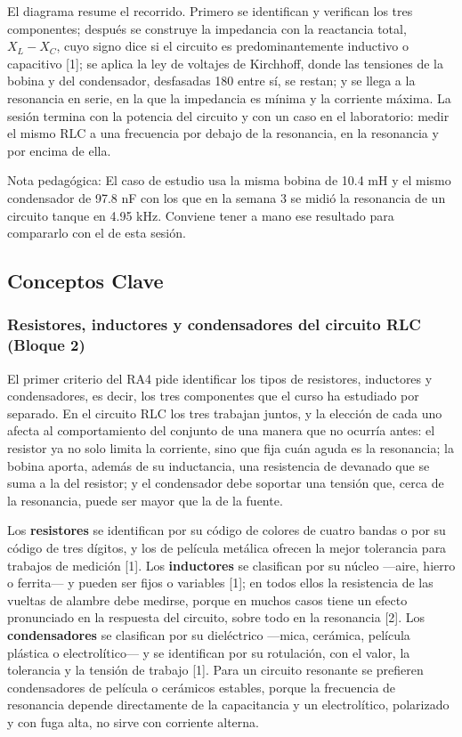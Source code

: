 \documentclass[11pt,letterpaper]{article}
\begin{document}
El diagrama resume el recorrido. Primero se identifican y verifican los tres componentes; después se construye la impedancia con la reactancia total, $X_L - X_C$, cuyo signo dice si el circuito es predominantemente inductivo o capacitivo [1]; se aplica la ley de voltajes de Kirchhoff, donde las tensiones de la bobina y del condensador, desfasadas 180\textdegree{} entre sí, se restan; y se llega a la resonancia en serie, en la que la impedancia es mínima y la corriente máxima. La sesión termina con la potencia del circuito y con un caso en el laboratorio: medir el mismo RLC a una frecuencia por debajo de la resonancia, en la resonancia y por encima de ella.

\begin{nota}{Nota pedagógica:}
El caso de estudio usa la misma bobina de 10.4 mH y el mismo condensador de 97.8 nF con los que en la semana 3 se midió la resonancia de un circuito tanque en 4.95 kHz. Conviene tener a mano ese resultado para compararlo con el de esta sesión.
\end{nota}

\subsection{Conceptos Clave}

\subsubsection{Resistores, inductores y condensadores del circuito RLC (Bloque 2)}

El primer criterio del RA4 pide identificar los tipos de resistores, inductores y condensadores, es decir, los tres componentes que el curso ha estudiado por separado. En el circuito RLC los tres trabajan juntos, y la elección de cada uno afecta al comportamiento del conjunto de una manera que no ocurría antes: el resistor ya no solo limita la corriente, sino que fija cuán aguda es la resonancia; la bobina aporta, además de su inductancia, una resistencia de devanado que se suma a la del resistor; y el condensador debe soportar una tensión que, cerca de la resonancia, puede ser mayor que la de la fuente.

Los \textbf{resistores} se identifican por su código de colores de cuatro bandas o por su código de tres dígitos, y los de película metálica ofrecen la mejor tolerancia para trabajos de medición [1]. Los \textbf{inductores} se clasifican por su núcleo ---aire, hierro o ferrita--- y pueden ser fijos o variables [1]; en todos ellos la resistencia de las vueltas de alambre debe medirse, porque en muchos casos tiene un efecto pronunciado en la respuesta del circuito, sobre todo en la resonancia [2]. Los \textbf{condensadores} se clasifican por su dieléctrico ---mica, cerámica, película plástica o electrolítico--- y se identifican por su rotulación, con el valor, la tolerancia y la tensión de trabajo [1]. Para un circuito resonante se prefieren condensadores de película o cerámicos estables, porque la frecuencia de resonancia depende directamente de la capacitancia y un electrolítico, polarizado y con fuga alta, no sirve con corriente alterna.
\end{document}
